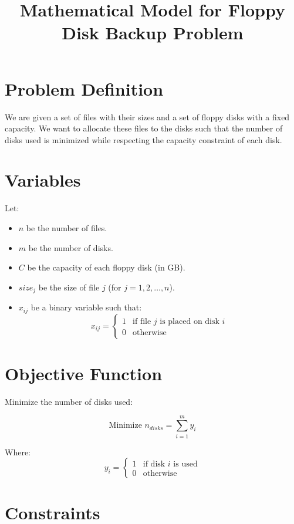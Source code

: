 \documentclass{article}
\begin{document}
\title{Mathematical Model for Floppy Disk Backup Problem}
\author{}
\date{}
\maketitle

\section*{Problem Definition}

We are given a set of files with their sizes and a set of floppy disks with a fixed capacity. We want to allocate these files to the disks such that the number of disks used is minimized while respecting the capacity constraint of each disk.

\section*{Variables}

Let:
\begin{itemize}
    \item $n$ be the number of files.
    \item $m$ be the number of disks.
    \item $C$ be the capacity of each floppy disk (in GB).
    \item $size_j$ be the size of file $j$ (for $j = 1, 2, \ldots, n$).
    \item $x_{ij}$ be a binary variable such that:
    \[
    x_{ij} = 
    \begin{cases} 
    1 & \text{if file } j \text{ is placed on disk } i \\
    0 & \text{otherwise}
    \end{cases}
    \]
\end{itemize}

\section*{Objective Function}

Minimize the number of disks used:

\[
\text{Minimize } n_{disks} = \sum_{i=1}^{m} y_i
\]

Where:
\[
y_i = 
\begin{cases} 
1 & \text{if disk } i \text{ is used} \\
0 & \text{otherwise}
\end{cases}
\]

\section*{Constraints}
\end{document}
